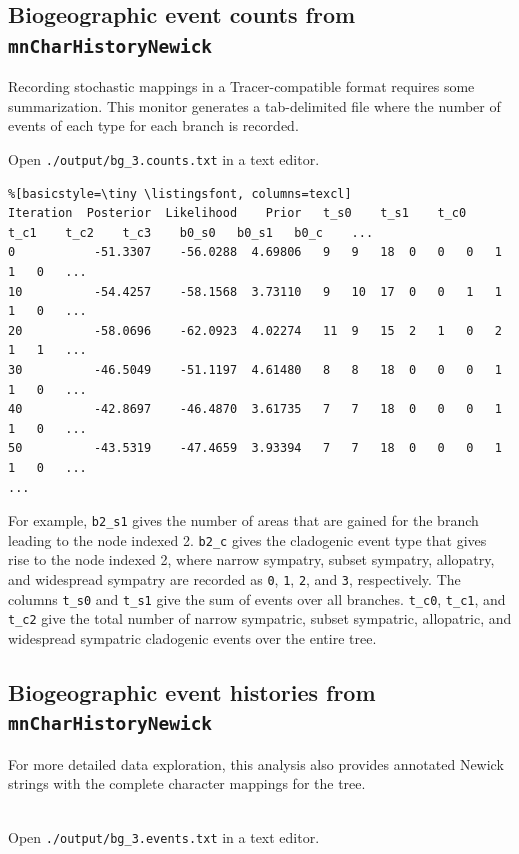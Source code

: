 \subsection{Biogeographic event counts from {\tt mnCharHistoryNewick}}

Recording stochastic mappings in a Tracer-compatible format requires some summarization.
This monitor generates a tab-delimited file where the number of events of each type for each branch is recorded.

Open {\tt ./output/bg\_3.counts.txt} in a text editor.

\begin{framed}
\begin{lstlisting}%[basicstyle=\tiny \listingsfont, columns=texcl]
Iteration  Posterior  Likelihood    Prior	t_s0	t_s1	t_c0	t_c1	t_c2	t_c3	b0_s0	b0_s1	b0_c	...
0           -51.3307    -56.0288  4.69806	9	9	18	0	0	0	1	1	0	...	
10          -54.4257    -58.1568  3.73110	9	10	17	0	0	1	1	1	0	...
20          -58.0696    -62.0923  4.02274	11	9	15	2	1	0	2	1	1	...
30          -46.5049    -51.1197  4.61480	8	8	18	0	0	0	1	1	0	...
40          -42.8697    -46.4870  3.61735	7	7	18	0	0	0	1	1	0	...
50          -43.5319    -47.4659  3.93394	7	7	18	0	0	0	1	1	0	...
...
\end{lstlisting}
\end{framed}

For example, {\tt b2\_s1} gives the number of areas that are gained for the branch leading to the node indexed 2.
{\tt b2\_c} gives the cladogenic event type that gives rise to the node indexed 2, where narrow sympatry, subset sympatry, allopatry, and widespread sympatry are recorded as {\tt 0}, {\tt 1}, {\tt 2}, and {\tt 3}, respectively. The columns {\tt t\_s0} and {\tt t\_s1} give the sum of events over all branches. {\tt t\_c0}, {\tt t\_c1}, and {\tt t\_c2} give the total number of narrow sympatric, subset sympatric, allopatric, and widespread sympatric cladogenic events over the entire tree.

\subsection{Biogeographic event histories from {\tt mnCharHistoryNewick}}

For more detailed data exploration, this analysis also provides annotated Newick strings with the complete character mappings for the tree.

\noindent \\ \impmark Open {\tt ./output/bg\_3.events.txt} in a text editor.

